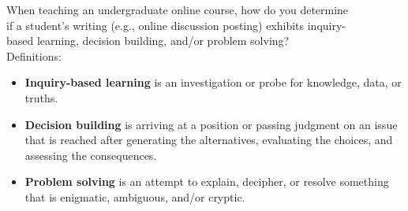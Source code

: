 \documentclass[a4,9pt]{beamer}
\begin{document}
\begin{frame}
\hspace*{0.7cm} When teaching an undergraduate online course, how do you determine \\
\hspace*{0.7cm} if a student's writing (e.g., online discussion posting) exhibits inquiry-\\
\hspace*{0.7cm} based learning, decision building, and/or problem solving?\\

\vspace*{0.2cm}
Definitions:\\

\vspace*{0.2cm}
\begin{itemize}
  \item \textbf{Inquiry-based learning} is an investigation or probe for knowledge, data, or truths.\\ 
  
  \vspace*{0.2cm}
  \item \textbf{Decision building} is arriving at a position or passing judgment on an issue that is reached after generating the alternatives, evaluating the choices, and assessing the consequences.\\
      
      \vspace*{0.2cm}
  \item \textbf{Problem solving} is an attempt to explain, decipher, or resolve something that is enigmatic, ambiguous, and/or cryptic.\\
\end{itemize}

\end{frame}
\end{document}
